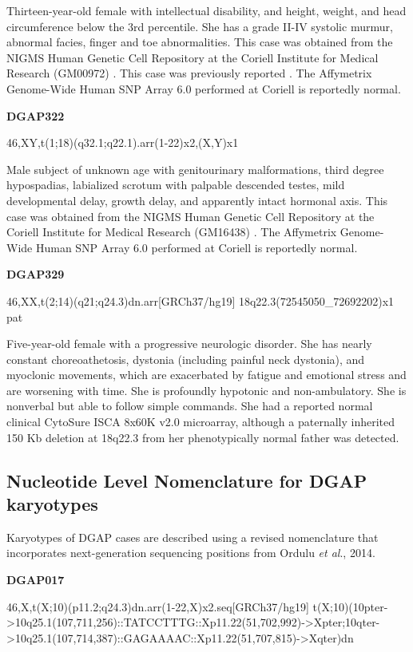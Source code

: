 \documentclass[a4paper,twoside=true,openright,parskip=full,chapterprefix=true,11pt,headings=normal,bibliography=totoc,listof=totoc,titlepage=on,captions=tableabove,draft=false]{scrreprt}
\theoremstyle{definition}
\theoremstyle{definition}
\theoremstyle{definition}
\theoremstyle{remark}
\begin{document}
Thirteen-year-old female with intellectual disability, and height,
weight, and head circumference below the 3rd percentile. She has a grade
II-IV systolic murmur, abnormal facies, finger and toe abnormalities.
This case was obtained from the NIGMS Human Genetic Cell Repository at
the Coriell Institute for Medical Research (GM00972) \citep{Tang2013}.
This case was previously reported \citep{Jenkins1975}. The Affymetrix
Genome-Wide Human SNP Array 6.0 performed at Coriell is reportedly
normal.

\textbf{DGAP322}

46,XY,t(1;18)(q32.1;q22.1).arr(1-22)x2,(X,Y)x1

Male subject of unknown age with genitourinary malformations, third
degree hypospadias, labialized scrotum with palpable descended testes,
mild developmental delay, growth delay, and apparently intact hormonal
axis. This case was obtained from the NIGMS Human Genetic Cell
Repository at the Coriell Institute for Medical Research (GM16438)
\citep{Tang2013, Frizell1998}. The Affymetrix Genome-Wide Human SNP
Array 6.0 performed at Coriell is reportedly normal.

\textbf{DGAP329}

46,XX,t(2;14)(q21;q24.3)dn.arr{[}GRCh37/hg19{]}
18q22.3(72545050\_72692202)x1 pat

Five-year-old female with a progressive neurologic disorder. She has
nearly constant choreoathetosis, dystonia (including painful neck
dystonia), and myoclonic movements, which are exacerbated by fatigue and
emotional stress and are worsening with time. She is profoundly
hypotonic and non-ambulatory. She is nonverbal but able to follow simple
commands. She had a reported normal clinical CytoSure ISCA 8x60K v2.0
microarray, although a paternally inherited 150 Kb deletion at 18q22.3
from her phenotypically normal father was detected.

\hypertarget{nucleotide-level-nomenclature-for-dgap-karyotypes}{%
\subsection{Nucleotide Level Nomenclature for DGAP
karyotypes}\label{nucleotide-level-nomenclature-for-dgap-karyotypes}}

Karyotypes of DGAP cases are described using a revised nomenclature that
incorporates next-generation sequencing positions from Ordulu \emph{et
al}., 2014.

\textbf{DGAP017}

46,X,t(X;10)(p11.2;q24.3)dn.arr(1-22,X)x2.seq{[}GRCh37/hg19{]}
t(X;10)(10pter-\textgreater{}10q25.1(107,711,256)::TATCCTTTG::Xp11.22(51,702,992)-\textgreater{}Xpter;10qter-\textgreater{}10q25.1(107,714,387)::GAGAAAAC::Xp11.22(51,707,815)-\textgreater{}Xqter)dn
\end{document}
